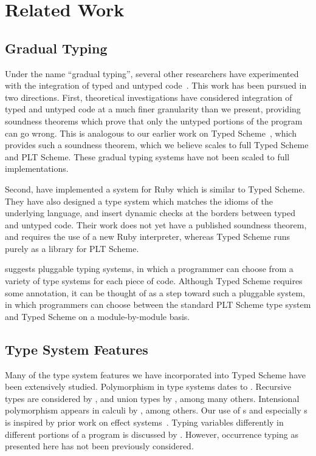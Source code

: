 
\section{Related Work}

\subsection{Gradual Typing}

Under the name ``gradual typing'', several other researchers  have
experimented with the integration of typed and untyped
code~\cite{st:gradual06, herman, wadler-findler, stop09}.  This work
has been pursued in two directions.  First, theoretical investigations
have considered integration of typed and untyped code at 
 a much finer granularity than we
present, providing soundness theorems which prove that only the
untyped portions of the program can go wrong.  This is analogous to our earlier work on Typed
Scheme~\cite{thf:dls2006}, which provides such a soundness theorem, which we
believe scales to full Typed Scheme and PLT Scheme.  These gradual
typing systems have not been scaled to full implementations.

Second, \citet{furr:ruby:sac, furr:ruby:stop} have implemented a
system for Ruby which is similar to Typed Scheme.  They have also
designed a type system which matches the idioms of the underlying
language, and insert dynamic checks at the borders between typed and
untyped code.  Their work does not yet have a published soundness
theorem, and requires the use of a new Ruby interpreter, whereas Typed
Scheme runs purely as a library for PLT Scheme.

\citet{bracha:pluggable} suggests pluggable typing systems, in which a
programmer can choose from a variety of type systems for each piece of
code.  Although Typed Scheme requires some annotation, it can be thought of
as a step toward such a pluggable system, in which programmers can choose
between the standard PLT Scheme type system and Typed Scheme on a
module-by-module basis.

\subsection{Type System Features}

Many of the type system features we have incorporated into Typed
Scheme have been extensively studied.  Polymorphism in type systems
dates to \citet{reynolds}.  Recursive types are considered by
\citet{ac:subtyping-recursive-types}, and union
types by \citet{pierce-union}, among many others. Intensional
polymorphism appears in calculi by \citet{harper95compiling}, among others. Our use of
\lexeff{}s and especially \lateff{}s is inspired by prior work on
effect systems~\cite{fx87}.  Typing variables differently in different
portions of a program is discussed by \citet{weirich98}.
However, occurrence typing as presented here has not been
previously considered.

